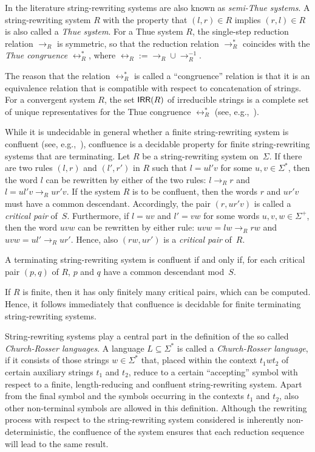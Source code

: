 In the literature string-rewriting systems are also known as \emph{semi-Thue systems}. A string-rewriting system $R$ with the property that $(l, r) \in R$ implies $(r, l) \in R$ is also called a \emph{Thue system}. For a Thue system $R$, the single-step reduction relation $\to_R$ is symmetric, so that the reduction relation $\to^*_R$ coincides with the \emph{Thue congruence} $\leftrightarrow^*_R$, where $\leftrightarrow_R := \rightarrow_R \cup \rightarrow_R^{-1}$.

The reason that the relation $\leftrightarrow^*_R$ is called a ``congruence'' relation is that it is an equivalence relation that is compatible with respect to concatenation of strings. For a convergent system $R$, the set $\IRR(R)$ of irreducible strings is a complete set of unique representatives for the Thue congruence $\leftrightarrow^*_R$ (see, e.g.,~\cite{bookOtto93}).

While it is undecidable in general whether a finite string-rewriting system is confluent (see, e.g.,~\cite{bookOtto93}), confluence is a decidable property for finite string-rewriting systems that are terminating. Let $R$ be a string-rewriting system on~$\Sigma$. If there are two rules $(l, r)$ and $(l', r')$ in $R$ such that $l = ul'v$ for some $u,v\in\Sigma^*$, then the word $l$ can be rewritten by either of the two rules: $l \rightarrow_R r$ and $l =ul'v\rightarrow_R ur'v$. If the system $R$ is to be confluent, then the words $r$ and $ur'v$ must have a common descendant. Accordingly, the pair $(r,ur'v)$ is called a \emph{critical pair} of~$S$. Furthermore, if $l = uv$ and $l'=vw$ for some words $u,v,w\in\Sigma^+$, then the word $uvw$ can be rewritten by either rule: $uvw= l w\rightarrow_R rw$ and $uvw =ul'\rightarrow_R ur'$. Hence, also $(rw,ur')$ is  a \emph{critical pair} of~$R$.

\begin{proposition}\label{PropCon}{\rm \cite{KnBe70}}
A terminating string-rewriting system is confluent if and only if, for each critical pair $(p,q)$ of $R$, $p$ and $q$ have a common descendant mod~$S$. 
\end{proposition}

If $R$ is finite, then it has only finitely many critical pairs, which can be computed. Hence, it follows immediately that confluence is decidable for finite terminating string-rewriting systems.

String-rewriting systems play a central part in the definition of the so called \emph{Church-Rosser languages}. A language $L \subseteq \Sigma^*$ is called a \emph{Church-Rosser language}, if it consists of those strings $w \in \Sigma^*$ that, placed within the context $t_1 w t_2$ of certain auxiliary strings $t_1$ and $t_2$, reduce to a certain ``accepting'' symbol with respect to a finite, length-reducing and confluent string-rewriting system. Apart from the final symbol and the symbols occurring in the contexts $t_1$ and $t_2$, also other non-terminal symbols are allowed in this definition. Although the rewriting process with respect to the string-rewriting system considered is inherently non-deterministic, the confluence of the system ensures that each reduction sequence will lead to the same result.

